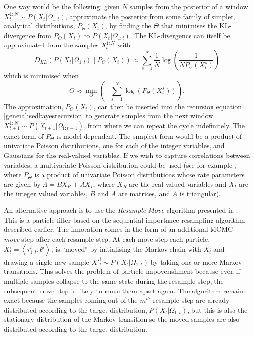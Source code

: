 \documentclass{article}
\begin{document}
One way would be the following: given $N$ samples from the posterior of a window $X^{1:N}_{t} \sim P(X_{t}|\Omega_{1:t})$, approximate the posterior from some family of simpler, analytical distributions, $P_\Theta(X_t)$, by finding the $\Theta$ that minimises the KL-divergence from $P_\Theta(X_t)$ to $P(X_{t}|\Omega_{1:t})$. The KL-divergence can itself be approximated from the samples $X^{1:N}_t$ with
\[
D_{KL}\left(P(X_{t}|\Omega_{1:t}) \mid P_\Theta(X_t)  \right) \approx
\sum_{s=1}^N \frac{1}{N}\log\left(\frac{1}{N P_\Theta(X^s_t)}\right)
\]
which is minimised when
\[
\Theta \approx \min_\Theta \left(-\sum_{s=1}^N \log\left(P_\Theta\left(X^s_t\right)\right) \right).
\]
The approximation, $P_\Theta(X_t)$, can then be inserted into the recursion equation \eqref{generalisedbayesrecursion} to generate samples from the next window $X^{1:N}_{t+1} \sim P(X_{t+1}|\Omega_{1:t+1})$, from where we can repeat the cycle indefinitely. The exact form of $P_\Theta$ is model dependent. The simplest form would be a product of univariate Poisson distributions, one for each of the integer variables, and Gaussians for the real-valued variables. If we wish to capture correlations between variables, a multivariate Poisson distribution could be used (see for example \citet{munoz2021multivariate}, where $P_\Theta$ is a product of univariate Poisson distributions whose rate parameters are given by $\Lambda = B X_R + A X_I$, where $X_R$ are the real-valued variables and $X_I$ are the integer valued variables, $B$ and $A$ are matrices, and $A$ is triangular).

An alternative approach is to use the \textit{Resample-Move} algorithm presented in \citet{gilks2001following}. This is a particle filter based on the sequential importance resampling algorithm described earlier. The innovation comes in the form of an additional MCMC \textit{move} step after each resample step. At each move step each particle, $X^i_t = \left<\tau_{1:t}^i,\theta^i\right>$, is ``moved'' by initialising the Markov chain with $X^i_t$ and drawing a single new sample $X'^{i}_{t} \sim P(X_t|\Omega_{1:t})$ by taking one or more Markov transitions. This solves the problem of particle impoverishment because even if multiple samples collapse to the same state during the resample step, the subsequent move step is likely to move them apart again. The algorithm remains exact because the samples coming out of the $m^{th}$ resample step are already distributed according to the target distribution, $P(X_t|\Omega_{1:t})$, but this is also the stationary distribution of the Markov transition so the moved samples are also distributed according to the target distribution.
\end{document}
